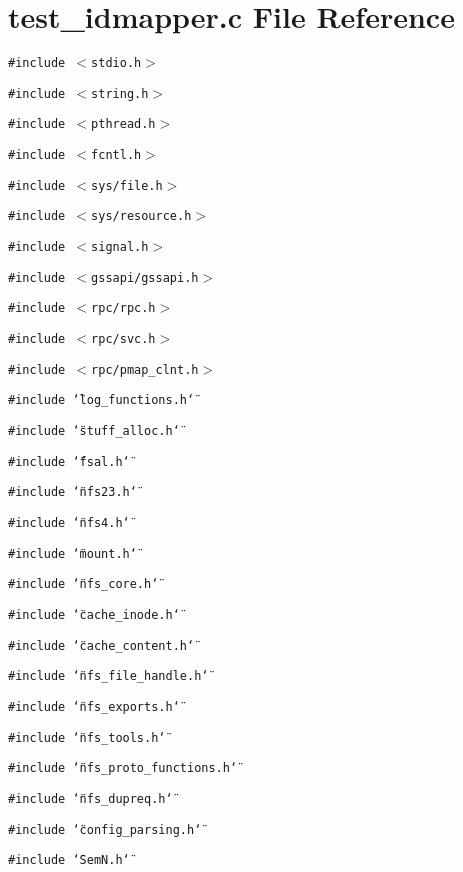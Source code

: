 \section{test\_\-idmapper.c File Reference}
\label{test__idmapper_8c}
{\tt \#include $<$stdio.h$>$}\par
{\tt \#include $<$string.h$>$}\par
{\tt \#include $<$pthread.h$>$}\par
{\tt \#include $<$fcntl.h$>$}\par
{\tt \#include $<$sys/file.h$>$}\par
{\tt \#include $<$sys/resource.h$>$}\par
{\tt \#include $<$signal.h$>$}\par
{\tt \#include $<$gssapi/gssapi.h$>$}\par
{\tt \#include $<$rpc/rpc.h$>$}\par
{\tt \#include $<$rpc/svc.h$>$}\par
{\tt \#include $<$rpc/pmap\_\-clnt.h$>$}\par
{\tt \#include \char`\"{}log\_\-functions.h\char`\"{}}\par
{\tt \#include \char`\"{}stuff\_\-alloc.h\char`\"{}}\par
{\tt \#include \char`\"{}fsal.h\char`\"{}}\par
{\tt \#include \char`\"{}nfs23.h\char`\"{}}\par
{\tt \#include \char`\"{}nfs4.h\char`\"{}}\par
{\tt \#include \char`\"{}mount.h\char`\"{}}\par
{\tt \#include \char`\"{}nfs\_\-core.h\char`\"{}}\par
{\tt \#include \char`\"{}cache\_\-inode.h\char`\"{}}\par
{\tt \#include \char`\"{}cache\_\-content.h\char`\"{}}\par
{\tt \#include \char`\"{}nfs\_\-file\_\-handle.h\char`\"{}}\par
{\tt \#include \char`\"{}nfs\_\-exports.h\char`\"{}}\par
{\tt \#include \char`\"{}nfs\_\-tools.h\char`\"{}}\par
{\tt \#include \char`\"{}nfs\_\-proto\_\-functions.h\char`\"{}}\par
{\tt \#include \char`\"{}nfs\_\-dupreq.h\char`\"{}}\par
{\tt \#include \char`\"{}config\_\-parsing.h\char`\"{}}\par
{\tt \#include \char`\"{}Sem\-N.h\char`\"{}}\par
